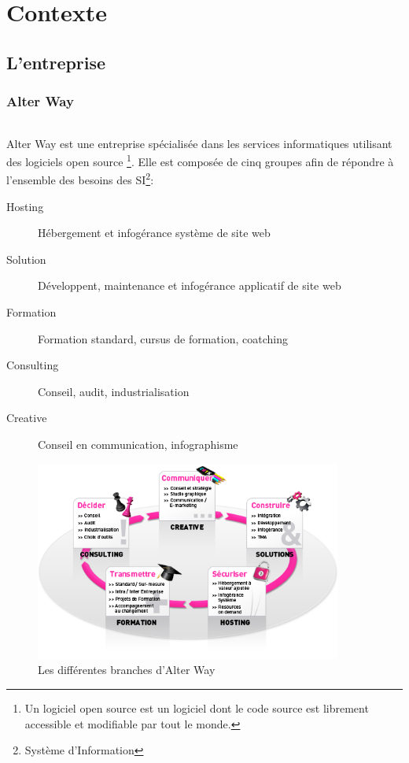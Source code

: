 \part{Contexte}
\chapter{L'entreprise}
\section{Alter Way}
\paragraph*{}
	Alter Way est une entreprise spécialisée dans les services informatiques utilisant des logiciels open source
	\footnote{Un logiciel open source est un logiciel dont le code source est librement accessible et modifiable par tout le monde.}.
	Elle est composée de cinq groupes afin de répondre à l'ensemble des besoins des SI\footnote{Système d'Information}:
	\begin{description}
		\item[Hosting] Hébergement et infogérance système de site web
		\item[Solution] Développent, maintenance et infogérance applicatif de site web
		\item[Formation] Formation standard, cursus de formation, coatching
		\item[Consulting] Conseil, audit, industrialisation
		\item[Creative] Conseil en communication, infographisme
	\end{description}

	\begin{figure}
	\centering
	\includegraphics[width=0.9\textwidth]{resource/img/aw_360}
	\caption{Les différentes branches d'Alter Way}
	\end{figure}

